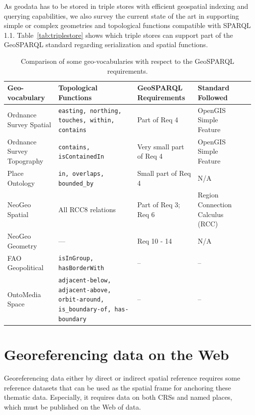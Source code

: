 As geodata has to be stored in triple stores with efficient geospatial indexing and querying capabilities, we also survey the current state of the art  in supporting simple or complex geometries and topological functions compatible with SPARQL 1.1. Table~\ref{tab:triplestore} shows which triple stores can support part of the GeoSPARQL standard regarding serialization and spatial functions.
\begin{table}
\begin{tabularx}{\textwidth}{|X|X|X|X|l}
\hline
\textbf{Geo-vocabulary} & \textbf{Topological Functions} & \textbf{GeoSPARQL Requirements} & \textbf{Standard Followed}\\
\hline
Ordnance Survey Spatial & \texttt{easting, northing, touches, within, contains} & Part of Req 4 & OpenGIS Simple Feature\\ \hline
Ordnance Survey Topography & \texttt{contains, isContainedIn} & Very small part of Req 4 & OpenGIS Simple Feature\\ \hline
Place Ontology & \texttt{in, overlaps, bounded\_by} & Small part of Req 4 & N/A\\
\hline
NeoGeo Spatial & All RCC8 relations & Part of Req 3; Req 6 & Region Connection Calculus (RCC)\\
\hline
NeoGeo Geometry & --- & Req 10 - 14 & N/A\\
\hline
FAO Geopolitical & \texttt{isInGroup, hasBorderWith} & -- & --\\
\hline
OntoMedia Space & \texttt{adjacent-below, adjacent-above, orbit-around, is\_boundary-of, has-boundary} & -- & --\\
\hline
\end{tabularx}
\caption{Comparison of some geo-vocabularies with respect to the GeoSPARQL requirements.}
\label{tab:geosparql}
\end{table}


\section{Georeferencing data on the Web}
\label{sec:georef}
Georeferencing data either by direct or indirect spatial reference requires some reference datasets that can be used as the spatial frame for anchoring these thematic data. Especially, it requires data on both CRSs and named places, which must be published on the Web of data.

